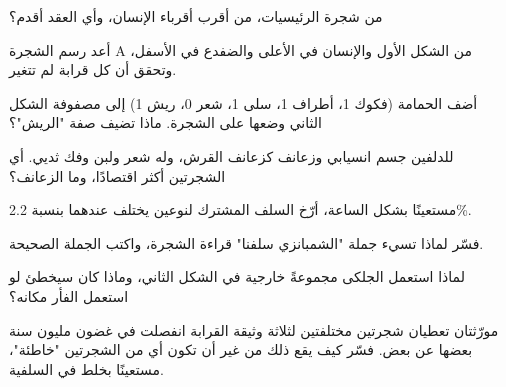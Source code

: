 \begin{exercise}[$\star$]\label{exo:g12:phylogenetic-trees:5}
من شجرة الرئيسيات، من أقرب أقرباء الإنسان، وأي العقد أقدم؟
\end{exercise}

\begin{exercise}[$\star\star$]\label{exo:g12:phylogenetic-trees:6}
أعد رسم الشجرة A من الشكل الأول والإنسان في الأعلى والضفدع في الأسفل،
وتحقق أن كل قرابة لم تتغير.
\end{exercise}

\begin{exercise}[$\star\star$]\label{exo:g12:phylogenetic-trees:7}
أضف الحمامة (فكوك 1، أطراف 1، سلى 1، شعر 0، ريش 1) إلى مصفوفة الشكل
الثاني وضعها على الشجرة. ماذا تضيف صفة "الريش"؟
\end{exercise}

\begin{exercise}[$\star\star$]\label{exo:g12:phylogenetic-trees:8}
للدلفين جسم انسيابي وزعانف كزعانف القرش، وله شعر ولبن وفك ثديي. أي
الشجرتين أكثر اقتصادًا، وما الزعانف؟
\end{exercise}

\begin{exercise}[$\star\star$]\label{exo:g12:phylogenetic-trees:9}
مستعينًا بشكل الساعة، أرّخ السلف المشترك لنوعين يختلف  عندهما بنسبة
2.2\%.
\end{exercise}

\begin{exercise}[$\star\star$]\label{exo:g12:phylogenetic-trees:10}
فسّر لماذا تسيء جملة "الشمبانزي سلفنا" قراءة الشجرة، واكتب الجملة
الصحيحة.
\end{exercise}

\begin{exercise}[$\star\star$]\label{exo:g12:phylogenetic-trees:11}
لماذا استعمل الجلكى مجموعةً خارجية في الشكل الثاني، وماذا كان سيخطئ لو
استعمل الفأر مكانه؟
\end{exercise}

\begin{exercise}[$\star\star\star$]\label{exo:g12:phylogenetic-trees:12}
مورّثتان تعطيان شجرتين مختلفتين لثلاثة  وثيقة القرابة انفصلت في
غضون مليون سنة بعضها عن بعض. فسّر كيف يقع ذلك من غير أن تكون أي من
الشجرتين "خاطئة"، مستعينًا بخلط  في  السلفية.
\end{exercise}

